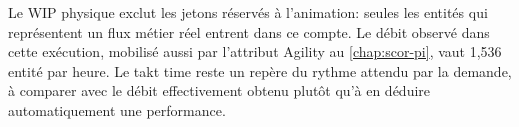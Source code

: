 
Le WIP physique exclut les jetons réservés à l'animation: seules les entités qui représentent un flux métier réel entrent dans ce compte. Le débit observé dans cette exécution, mobilisé aussi par l'attribut Agility au \cref{chap:scor-pi}, vaut 1,536 entité par heure. Le takt time reste un repère du rythme attendu par la demande, à comparer avec le débit effectivement obtenu plutôt qu'à en déduire automatiquement une performance.

